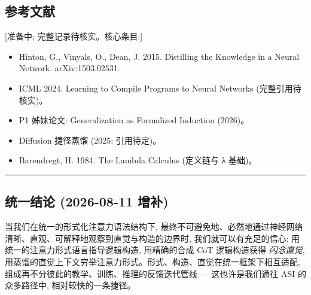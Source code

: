 \documentclass[
]{article}
\providecommand{\tightlist}{%
  \setlength{\itemsep}{0pt}\setlength{\parskip}{0pt}}
\begin{document}
\subsection{参考文献}\label{ux53c2ux8003ux6587ux732e}

{[}准备中; 完整记录待核实。核心条目:{]}

\begin{itemize}
\tightlist
\item
  Hinton, G., Vinyals, O., Dean, J. 2015. Distilling the Knowledge in a
  Neural Network. arXiv:1503.02531.
\item
  ICML 2024. Learning to Compile Programs to Neural Networks
  (完整引用待核实)。
\item
  P1 姊妹论文: Generalization as Formalized Induction (2026)。
\item
  Diffusion 捷径蒸馏 (2025; 引用待定)。
\item
  Barendregt, H. 1984. The Lambda Calculus (定义链与 λ 基础)。
\end{itemize}

\begin{center}\rule{0.5\linewidth}{0.5pt}\end{center}

\subsection{统一结论 (2026-08-11
增补)}\label{ux7edfux4e00ux7ed3ux8bba-2026-08-11-ux589eux8865}

当我们在统一的形式化注意力语法结构下,
最终不可避免地、必然地通过神经网络清晰、直观、可解释地观察到直觉与构造的边界时,
我们就可以有充足的信心: 用统一的注意力形式语言指导逻辑构造, 用精确的合成
CoT 逻辑构造获得 \emph{闪念直觉},
用蒸馏的直觉上下文穷举注意力形式。形式、构造、直觉在统一框架下相互适配,
组成再不分彼此的教学、训练、推理的反馈迭代管线 --- 这也许是我们通往 ASI
的众多路径中, 相对较快的一条捷径。
\end{document}
